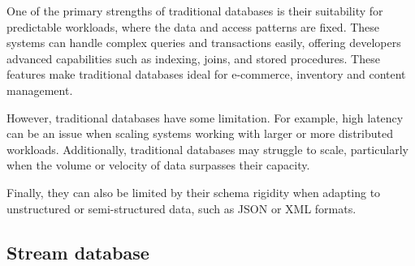 \documentclass[utf8,9pt]{extarticle}
\begin{document}
One of the primary strengths of traditional databases is their suitability for predictable workloads, where the data and access patterns are fixed. These systems can handle complex queries and transactions easily, offering developers advanced capabilities such as indexing, joins, and stored procedures. These features make traditional databases ideal for e-commerce, inventory and content management.

However, traditional databases have some limitation. For example, high latency can be an issue when scaling systems working with larger or more distributed workloads. Additionally, traditional databases may struggle to scale, particularly when the volume or velocity of data surpasses their capacity.

Finally, they can also be limited by their schema rigidity when adapting to unstructured or semi-structured data, such as JSON or XML formats.

\subsection{Stream database}
\end{document}
